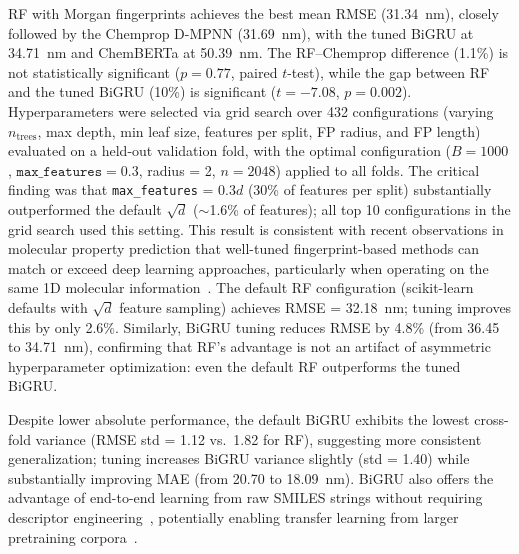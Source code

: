 \documentclass[journal=jcisd8,manuscript=article]{achemso}
\begin{document}
RF with Morgan fingerprints achieves the best mean RMSE (31.34~nm), closely followed by the Chemprop D-MPNN (31.69~nm), with the tuned BiGRU at 34.71~nm and ChemBERTa at 50.39~nm.
The RF--Chemprop difference (1.1\%) is not statistically significant ($p = 0.77$, paired $t$-test), while the gap between RF and the tuned BiGRU (10\%) is significant ($t = -7.08$, $p = 0.002$).
Hyperparameters were selected via grid search over 432 configurations (varying $n_\text{trees}$, max depth, min leaf size, features per split, FP radius, and FP length) evaluated on a held-out validation fold, with the optimal configuration ($B = 1000$, $\texttt{max\_features} = 0.3$, radius = 2, $n = 2048$) applied to all folds.
The critical finding was that \texttt{max\_features} = $0.3d$ (30\% of features per split) substantially outperformed the default $\sqrt{d}$ ($\sim$1.6\% of features); all top 10 configurations in the grid search used this setting.
This result is consistent with recent observations in molecular property prediction that well-tuned fingerprint-based methods can match or exceed deep learning approaches, particularly when operating on the same 1D molecular information~\cite{panapitiya2022evaluation, walters2021applications, fooladi2025evaluating}.
The default RF configuration (scikit-learn defaults with $\sqrt{d}$ feature sampling) achieves RMSE = 32.18~nm; tuning improves this by only 2.6\%.
Similarly, BiGRU tuning reduces RMSE by 4.8\% (from 36.45 to 34.71~nm), confirming that RF's advantage is not an artifact of asymmetric hyperparameter optimization: even the default RF outperforms the tuned BiGRU.

Despite lower absolute performance, the default BiGRU exhibits the lowest cross-fold variance (RMSE std = 1.12 vs.\ 1.82 for RF), suggesting more consistent generalization; tuning increases BiGRU variance slightly (std = 1.40) while substantially improving MAE (from 20.70 to 18.09~nm).
BiGRU also offers the advantage of end-to-end learning from raw SMILES strings without requiring descriptor engineering~\cite{chenMolecularLanguage2023}, potentially enabling transfer learning from larger pretraining corpora~\cite{vermeire2021transfer}.
\end{document}
